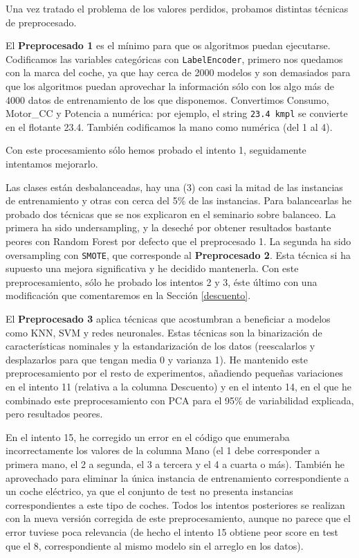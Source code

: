 \documentclass{article}
\begin{document}
Una vez tratado el problema de los valores perdidos, probamos distintas técnicas de preprocesado.

El \textbf{Preprocesado 1} es el mínimo para que os algoritmos puedan
ejecutarse. Codificamos las variables categóricas con
\texttt{LabelEncoder}, primero nos quedamos con la marca del coche, ya
que hay cerca de 2000 modelos y son demasiados para que los algoritmos
puedan aprovechar la información sólo con los algo más de 4000 datos
de entrenamiento de los que disponemos. Convertimos Consumo, Motor\_CC
y Potencia a numérica: por ejemplo, el string \texttt{23.4 kmpl} se
convierte en el flotante 23.4. También codificamos la mano como
numérica (del 1 al 4).

Con este procesamiento sólo hemos probado el intento 1, seguidamente
intentamos mejorarlo.

Las clases están desbalanceadas, hay una (3) con casi la mitad de las
instancias de entrenamiento y otras con cerca del 5\% de las
instancias. Para balancearlas he probado dos técnicas que se nos
explicaron en el seminario sobre balanceo. La primera ha sido
undersampling, y la deseché por obtener resultados bastante peores con
Random Forest por defecto que el preprocesado 1. La segunda ha sido
oversampling con \texttt{SMOTE}, que corresponde al
\textbf{Preprocesado 2}. Esta técnica si ha supuesto una mejora
significativa y he decidido mantenerla. Con este preprocesamiento,
sólo he probado los intentos 2 y 3, éste último con una modificación que comentaremos en la Sección \ref{descuento}.

El \textbf{Preprocesado 3} aplica técnicas que acostumbran a
beneficiar a modelos como KNN, SVM y redes neuronales. Estas técnicas
son la binarización de características nominales y la estandarización
de los datos (reescalarlos y desplazarlos para que tengan media 0 y
varianza 1). He mantenido este preprocesamiento por el resto de
experimentos, añadiendo pequeñas variaciones en el intento 11
(relativa a la columna Descuento) y en el intento 14, en el que he
combinado este preprocesamiento con PCA para el 95\% de variabilidad
explicada, pero resultados peores.

En el intento 15, he corregido un error en el código que enumeraba
incorrectamente los valores de la columna Mano (el 1 debe corresponder
a primera mano, el 2 a segunda, el 3 a tercera y el 4 a cuarta o
más). También he aprovechado para eliminar la única instancia de
entrenamiento correspondiente a un coche eléctrico, ya que el conjunto
de test no presenta instancias correspondientes a este tipo de
coches. Todos los intentos posteriores se realizan con la nueva
versión corregida de este preprocesamiento, aunque no parece que el
error tuviese poca relevancia (de hecho el intento 15 obtiene peor
score en test que el 8, correspondiente al mismo modelo sin el arreglo
en los datos).
\end{document}
